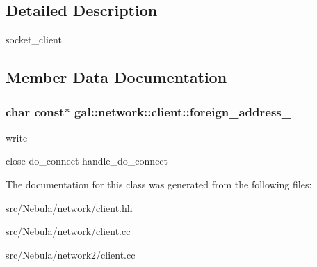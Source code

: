 \subsection{\-Detailed \-Description}
socket\-\_\-client 

\subsection{\-Member \-Data \-Documentation}
\hypertarget{classgal_1_1network_1_1client_a50f554a8893793fdd9e0a2d53b79f60e}{
\subsubsection[{foreign\-\_\-address\-\_\-}]{\setlength{\rightskip}{0pt plus 5cm}char const$\ast$ {\bf gal\-::network\-::client\-::foreign\-\_\-address\-\_\-}}}\label{classgal_1_1network_1_1client_a50f554a8893793fdd9e0a2d53b79f60e}


write 

close do\-\_\-connect handle\-\_\-do\-\_\-connect 

\-The documentation for this class was generated from the following files\-:\begin{DoxyCompactItemize}
\item 
src/\-Nebula/network/client.\-hh\item 
src/\-Nebula/network/client.\-cc\item 
src/\-Nebula/network2/client.\-cc\end{DoxyCompactItemize}
